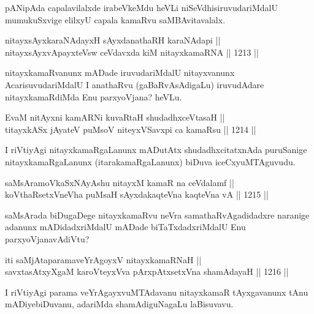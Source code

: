\begin{artha}
pANipAda capalavilalxde irabeVkeMdu heVLi niSeVdhisiruvudariMdalU mumukuSxvige elilxyU capala kamaRvu saMBAvitavalalx.
\end{artha}

\begin{shl}
nitayxsAyxkaraNAdayxH sAyxdanathaRH karaNAdapi || \\
nitayxsAyxvApayxteV\s sw ceVdavxda kiM nitayxkamaRNA \hfill || 1213 ||  
\end{shl}

\begin{artha}
nitayxkamaRvanunx mADade iruvudariMdalU nitayxvanunx AcarisuvudariMdalU I anathaRvu (gaBaRvAsAdigaLu) iruvudAdare nitayxkamaRdiMda Enu parxyoVjana? heVLu.
\end{artha}

\begin{shl}
EvaM nitAyxni kamARNi kuvaRtaH shudadhxceVtasaH || \\
titayxkASx jAyateV puMsoV niteyxVSavxpi ca kamaRsu \hfill || 1214 ||  
\end{shl}

\begin{artha}
I riVtiyAgi nitayxkamaRgaLanunx mADutAtx shudadhxcitatxnAda puruSanige nitayxkamaRgaLanunx (itarakamaRgaLanunx) biDuva iceCxyuMTAguvudu.
\end{artha}


\begin{shl}
saMsAramoVkaSxNAyA\s \s shu nitayxM kamaR na ceVdalamf || \\
koV\s thaRsetxVneVha puMsaH sAyxdakaqteVna kaqteVna vA \hfill || 1215 ||  
\end{shl}

\begin{artha}
saMsArada biDugaDege nitayxkamaRvu neVra samathaRvAgadidadxre naranige adanunx mADidadxriMdalU mADade biTaTxdadxriMdalU Enu parxyoVjanavAdiVtu?
\end{artha}

\begin{shl}
iti saMjAtaparamaveYrAgoyxV nitayxkamaRNaH || \\
savxtasAtxyXgaM karoVteyxVva pArxpAtxsetxVna shamAdayaH \hfill || 1216 ||  
\end{shl}

\begin{artha}
I riVtiyAgi parama veYrAgayxvuMTAdavanu nitayxkamaR tAyxgavanunx tAnu mADiyebiDuvanu, adariMda shamAdiguNagaLu laBisuvavu.
\end{artha}


